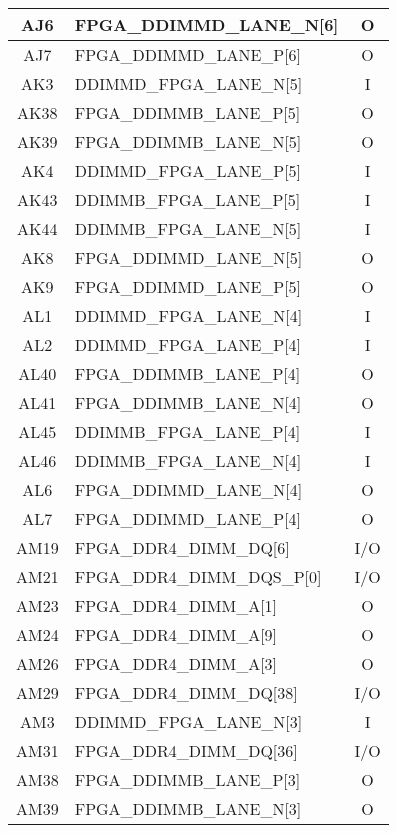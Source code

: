 \begin{longtable}[l]{| c | l | c |}
  AJ6  & FPGA\_DDIMMD\_LANE\_N[6]     & O   \\ \hline
  AJ7  & FPGA\_DDIMMD\_LANE\_P[6]     & O   \\ \hline
  AK3  & DDIMMD\_FPGA\_LANE\_N[5]     & I   \\ \hline
  AK38 & FPGA\_DDIMMB\_LANE\_P[5]     & O   \\ \hline
  AK39 & FPGA\_DDIMMB\_LANE\_N[5]     & O   \\ \hline
  AK4  & DDIMMD\_FPGA\_LANE\_P[5]     & I   \\ \hline
  AK43 & DDIMMB\_FPGA\_LANE\_P[5]     & I   \\ \hline
  AK44 & DDIMMB\_FPGA\_LANE\_N[5]     & I   \\ \hline
  AK8  & FPGA\_DDIMMD\_LANE\_N[5]     & O   \\ \hline
  AK9  & FPGA\_DDIMMD\_LANE\_P[5]     & O   \\ \hline
  AL1  & DDIMMD\_FPGA\_LANE\_N[4]     & I   \\ \hline
  AL2  & DDIMMD\_FPGA\_LANE\_P[4]     & I   \\ \hline
  AL40 & FPGA\_DDIMMB\_LANE\_P[4]     & O   \\ \hline
  AL41 & FPGA\_DDIMMB\_LANE\_N[4]     & O   \\ \hline
  AL45 & DDIMMB\_FPGA\_LANE\_P[4]     & I   \\ \hline
  AL46 & DDIMMB\_FPGA\_LANE\_N[4]     & I   \\ \hline
  AL6  & FPGA\_DDIMMD\_LANE\_N[4]     & O   \\ \hline
  AL7  & FPGA\_DDIMMD\_LANE\_P[4]     & O   \\ \hline
  AM19 & FPGA\_DDR4\_DIMM\_DQ[6]      & I/O \\ \hline
  AM21 & FPGA\_DDR4\_DIMM\_DQS\_P[0]  & I/O \\ \hline
  AM23 & FPGA\_DDR4\_DIMM\_A[1]       & O   \\ \hline
  AM24 & FPGA\_DDR4\_DIMM\_A[9]       & O   \\ \hline
  AM26 & FPGA\_DDR4\_DIMM\_A[3]       & O   \\ \hline
  AM29 & FPGA\_DDR4\_DIMM\_DQ[38]     & I/O \\ \hline
  AM3  & DDIMMD\_FPGA\_LANE\_N[3]     & I   \\ \hline
  AM31 & FPGA\_DDR4\_DIMM\_DQ[36]     & I/O \\ \hline
  AM38 & FPGA\_DDIMMB\_LANE\_P[3]     & O   \\ \hline
  AM39 & FPGA\_DDIMMB\_LANE\_N[3]     & O   \\ \hline

\end{longtable}
